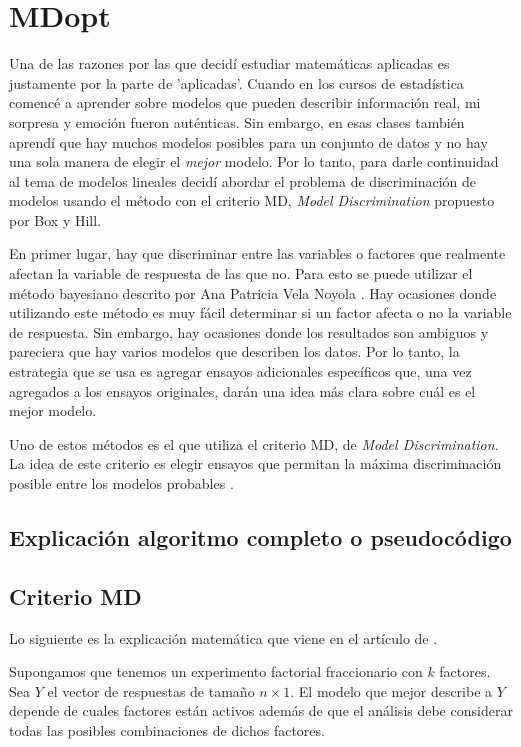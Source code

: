 \chapter{MDopt}

Una de las razones por las que decidí estudiar matemáticas aplicadas es justamente por la parte de 'aplicadas'. Cuando en los cursos de estadística comencé a aprender sobre modelos que pueden describir información real, mi sorpresa y emoción fueron auténticas. Sin embargo, en esas clases también aprendí que hay muchos modelos posibles para un conjunto de datos y no hay una sola manera de elegir el \textit{mejor} modelo. Por lo tanto, para darle continuidad al tema de modelos lineales decidí abordar el problema de discriminación de modelos usando el método con el criterio MD, \textit{Model Discrimination} propuesto por Box y Hill. 

En primer lugar, hay que discriminar entre las variables o factores que realmente afectan la variable de respuesta de las que no. Para esto se puede utilizar el método bayesiano descrito por Ana Patricia Vela Noyola \cite{tesis_paty}. Hay ocasiones donde utilizando este método es muy fácil determinar si un factor afecta o no la variable de respuesta. Sin embargo, hay ocasiones donde los resultados son ambiguos y pareciera que hay varios modelos que describen los datos. Por lo tanto, la estrategia que se usa es agregar ensayos adicionales específicos que, una vez agregados a los ensayos originales, darán una idea más clara sobre cuál es el mejor modelo. 

Uno de estos métodos es el  que utiliza el criterio MD, de \textit{Model Discrimination}. La idea de este criterio es elegir ensayos que permitan la máxima discriminación posible entre los modelos probables \cite{meyer1996}. 

\section{Explicación algoritmo completo o pseudocódigo}

\section{Criterio MD}
Lo siguiente es la explicación matemática que viene en el artículo de \cite{meyer1996}. 

Supongamos que tenemos un experimento factorial fraccionario con $k$ factores. Sea \textbf{$Y$} el vector de respuestas de tamaño $n \times 1$. El modelo que mejor describe a \textbf{$Y$} depende de cuales factores están activos además de que el análisis debe considerar todas las posibles combinaciones de dichos factores. 

